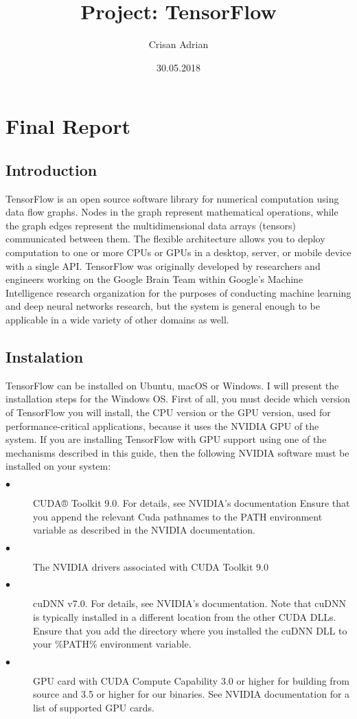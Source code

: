 \documentclass[a4paper,10pt]{report}
\title{
Project: TensorFlow \\ 
}
\author{Crisan Adrian}
\date{30.05.2018}
\begin{document}
\maketitle

 
\chapter{Final Report}
\section{Introduction}
TensorFlow is an open source software library for numerical computation using data flow graphs. Nodes in the graph represent mathematical operations, 
while the graph edges represent the multidimensional data arrays (tensors) communicated between them. The flexible architecture allows you to deploy 
computation to one or more CPUs or GPUs in a desktop, server, or mobile device with a single API. TensorFlow was originally developed by researchers 
and engineers working on the Google Brain Team within Google's Machine Intelligence research organization for the purposes of conducting machine learning 
and deep neural networks research, but the system is general enough to be applicable in a wide variety of other domains as well. 


 \section{Instalation}
TensorFlow can be installed on Ubuntu, macOS or Windows. I will present the installation steps for
the Windows OS. First of all, you must decide which version of TensorFlow you will install, the CPU version or the GPU version,
used for performance-critical applications, because it uses the NVIDIA GPU of the system. If you are installing TensorFlow with 
GPU support using one of the mechanisms described in this guide, then the following NVIDIA software must be installed on your system:

\begin{description}
\item[$\bullet$] CUDA® Toolkit 9.0. For details, see NVIDIA's documentation Ensure that you append the relevant Cuda pathnames to the PATH environment variable as described in the NVIDIA documentation.
\item[$\bullet$] The NVIDIA drivers associated with CUDA Toolkit 9.0
\item[$\bullet$]cuDNN v7.0. For details, see NVIDIA's documentation. Note that cuDNN is typically installed in a different location from the other CUDA DLLs. Ensure that you add the directory where you 
installed the cuDNN DLL to your \%PATH\% environment variable.
\item[$\bullet$]GPU card with CUDA Compute Capability 3.0 or higher for building from source and 3.5 or higher for our binaries. See NVIDIA documentation for a list of supported GPU cards.\\
\end{description}
\end{document}
